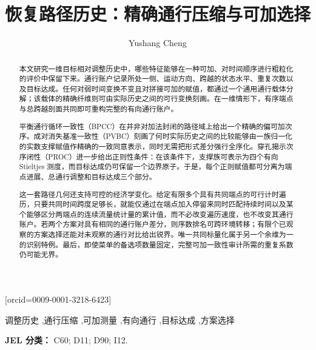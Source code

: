 \documentclass[a4paper,fleqn]{cas-sc}
\theoremstyle{definition}
\theoremstyle{remark}
\newcommand{\1}{\mathbf 1}
\begin{document}

\title[mode=title]{恢复路径历史：精确通行压缩与可加选择}

\author[1]{Yushang Cheng}[orcid={0009-0001-3218-6423}]
\cormark[1]



\begin{abstract}
本文研究一维目标相对调整历史中，哪些特征能够在一种可加、对时间顺序进行粗粒化的评价中保留下来。通行账户记录所处一侧、运动方向、跨越的状态水平、重复次数以及目标达成。任何对弱时间变换不变且对拼接可加的赋值，都通过一个通用通行载体分解；该载体的精确纤维则可由实际历史之间的可行变换刻画。在一维情形下，有序端点与总跨越剖面共同即可重构完整的有向通行账户。

平衡通行循环一致性（BPCC）在并非对加法封闭的路径域上给出一个精确的偏可加次序。成对消失基准一致性（PVBC）刻画了何时实际历史之间的比较能够由一族归一化的实数支撑赋值作精确的一致同意表示，同时无需把形式差分强行全序化。穿孔揭示次序闭性（PROC）进一步给出正则性条件：在该条件下，支撑族可表示为四个有向 Stieltjes 测度，而目标达成仍可保留一个边界原子。于是，每个正则赋值都可分离为端点进展、总通行调整和目标达成三个部分。

这一套路径几何还支持可控的经济学变化。给定有限多个具有共同端点的可行计时遍历，只要共同时间跨度足够长，就能仅通过在端点加入停留来同时匹配持续时间以及某个能够区分两端点的连续流量统计量的累计值，而不必改变遍历速度，也不改变其通行账户。若两个方案对具有相同的通行账户差分，则序数排名可跨环境转移；有限个已观察的方案选择还能对未观察的通行对比给出锐界。唯一共同标量化属于另一个余维为一的识别特例。最后，即使菜单的备选项数量固定，完整可加一致性审计所需的重复系数仍可能无界。
\end{abstract}

\begin{keywords}
调整历史 \sep 通行压缩 \sep 可加测量 \sep 有向通行 \sep 目标达成 \sep 方案选择
\end{keywords}

\begingroup\hfuzz=120pt\maketitle\endgroup
{}

\noindent\textbf{JEL 分类：} C60; D11; D90; I12.



















\end{document}
